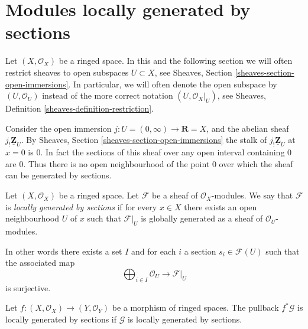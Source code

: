 \section{Modules locally generated by sections}
\label{section-locally-generated}

\noindent
Let $(X, \mathcal{O}_X)$ be a ringed space.
In this and the following section we will often restrict
sheaves to open subspaces $U \subset X$, see
Sheaves, Section \ref{sheaves-section-open-immersions}.
In particular, we will often denote the open subspace
by $(U, \mathcal{O}_U)$ instead of the more correct
notation $(U, \mathcal{O}_X|_U)$, see
Sheaves, Definition \ref{sheaves-definition-restriction}.

\medskip\noindent
Consider the open immersion
$j : U = (0 , \infty) \to \mathbf{R} = X$, and the abelian sheaf
$j_!\underline{\mathbf{Z}}_U$. By Sheaves, Section
\ref{sheaves-section-open-immersions} the stalk of
$j_!\underline{\mathbf{Z}}_U$ at $x = 0$ is $0$. In fact the
sections of this sheaf over any open interval containing $0$
are $0$. Thus there is no open neighbourhood of the point
$0$ over which the sheaf can be generated by sections.

\begin{definition}
\label{definition-locally-generated}
Let $(X, \mathcal{O}_X)$ be a ringed space.
Let $\mathcal{F}$ be a sheaf of $\mathcal{O}_X$-modules.
We say that $\mathcal{F}$ is {\it locally generated by sections}
if for every $x \in X$ there exists an open
neighbourhood $U$ of $x$ such that $\mathcal{F}|_U$
is globally generated as a sheaf of $\mathcal{O}_U$-modules.
\end{definition}

\noindent
In other words there exists a set $I$ and for
each $i$ a section $s_i \in \mathcal{F}(U)$ such
that the associated map
$$
\bigoplus\nolimits_{i \in I} \mathcal{O}_U
\longrightarrow
\mathcal{F}|_U
$$
is surjective.

\begin{lemma}
\label{lemma-pullback-locally-generated}
Let $f : (X, \mathcal{O}_X) \to (Y, \mathcal{O}_Y)$
be a morphism of ringed spaces.
The pullback $f^*\mathcal{G}$ is locally generated by sections
if $\mathcal{G}$ is locally generated by sections.
\end{lemma}

